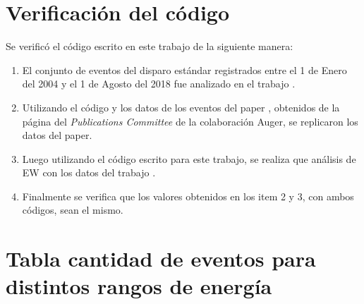 \section*{Verificación del código}
Se verificó el código escrito en este trabajo de la siguiente manera:

\begin{enumerate}[noitemsep]
    \item El conjunto de eventos del disparo estándar registrados entre el 1 de Enero del 2004 y el 1 de Agosto del 2018 fue analizado en el trabajo \cite{Aab_2020}.
    \item Utilizando el código y los datos de los eventos del paper \cite{Aab_2020}, obtenidos de la página del \emph{Publications Committee} de la colaboración Auger, se replicaron los datos del paper. 
    \item Luego utilizando el código escrito para este trabajo, se realiza que análisis de EW con los datos del trabajo \cite{Aab_2020}. 
    \item Finalmente se verifica que los valores obtenidos en los item 2 y 3, con  ambos códigos, sean el mismo.
\end{enumerate}


\section*{Tabla cantidad de eventos para distintos rangos de energía}

